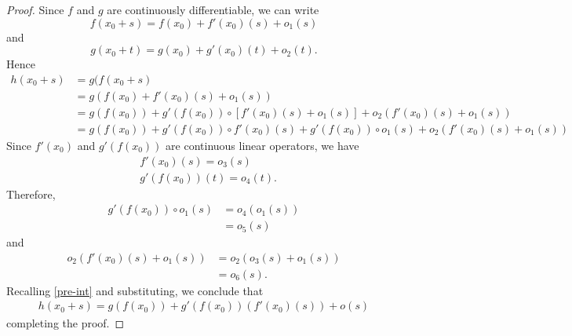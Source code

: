   \begin{proof} Since $f$ and $g$ are continuously differentiable, we can write
			\begin{equation*}
				f(x_0 + s) = f(x_0) + f'(x_0)(s) + o_{1}(s)
			\end{equation*}
			and
      \begin{equation*}
				g(x_0 + t) = g(x_0) + g'(x_0)(t)+ o_{2}(t).
			\end{equation*}
						Hence
			\begin{equation}
        \label{pre-order}
				\begin{split}
					h(x_0 + s) &= g(f(x_0 +s)
					\\
					&= g(f(x_0) + f'(x_0)(s) + o_{1}(s))
					\\
					&= g(f(x_0)) + g'(f(x_0)) \circ [f'(x_0)(s) + o_{1}(s)] 
					+ o_{2}(f'(x_0)(s) + o_{1}(s))
					\\
					&= g(f(x_0)) + g'(f(x_0)) \circ f'(x_0)(s) +
					g'(f(x_0)) \circ o_{1}(s) + o_{2}(f'(x_0)(s) + o_{1}(s))
				\end{split}
			\end{equation}
      Since $f'(x_0)$
			and $g'(f(x_0))$ are continuous linear operators, we have
			\begin{equation*}
				\begin{split}
         &  f'(x_0)(s)
           = o_{3}(s)
					\\
					& g'(f(x_0))(t) = o_{4}(t).
				\end{split}
			\end{equation*}
      Therefore,
      \begin{equation*}
        \begin{split}
          g'(f(x_0)) \circ o_{1}(s)
          & = o_{4}(o_{1}(s))
          \\
          & = o_{5}(s)
        \end{split}
      \end{equation*}
      and
      \begin{equation*}
      \begin{split}
      o_{2}(f'(x_0)(s) + o_{1}(s))
      & = o_{2}(o_{3}(s) + o_{1}(s))
      \\
      & =o_{6}(s).
      \end{split}
      \end{equation*}
			Recalling \eqref{pre-int} and substituting, we conclude that
			\begin{equation*}
				\begin{split}
				h(x_0 + s) = g(f(x_0)) + g'(f(x_0))(f'(x_0)(s)) +
				o(s)
        \end{split}
        \end{equation*}
			 completing the proof. 
   \end{proof}
%
%
%
%
%


